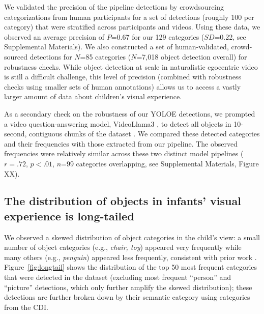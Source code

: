 We validated the precision of the pipeline detections by crowdsourcing categorizations from human participants for a set of detections (roughly 100 per category) that were stratified across participants and videos. Using these data, we observed an average precision of $P$=0.67 for our 129 categories ($SD$=0.22, see Supplemental Materials). We also constructed a set of human-validated, crowd-sourced detections for $N$=85 categories ($N$=7,018 object detection overall) for robustness checks. While object detection at scale in naturalistic egocentric video is still a difficult challenge, this level of precision (combined with robustness checks using smaller sets of human annotations) allows us to access a vastly larger amount of data about children's visual experience. 

As a secondary check on the robustness of our YOLOE detections, we prompted a video question-answering model, VideoLlama3 \citep{zhang2025videollama}, to detect all objects in 10-second, contiguous chunks of the dataset \citep{sepuri2025characterizing}. We compared these detected categories and their frequencies with those extracted from our pipeline. The observed frequencies were relatively similar across these two distinct model pipelines ($r=.72$, $p<.01$, $n$=99 categories overlapping, see Supplemental Materials, Figure XX).

\subsection*{The distribution of objects in infants' visual experience is long-tailed}

We observed a skewed distribution of object categories in the child's view: a small number of object categories (e.g., \textit{chair, toy}) appeared very frequently while many others (e.g., \textit{penguin}) appeared less frequently, consistent with prior work \citep{clerkin2017real}. Figure~\ref{fig:longtail} shows the distribution of the top 50 most frequent categories that were detected in the dataset (excluding most frequent ``person'' and ``picture'' detections, which only further amplify the skewed distribution); these detections are further broken down by their semantic category using categories from the CDI.

